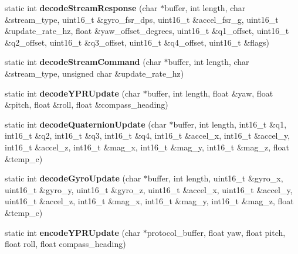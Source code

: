 \begin{DoxyCompactItemize}
\item 
\hypertarget{class_i_m_u_protocol_a97c641e18f3881b989a8f89fcb08458c}{}static int {\bfseries decode\+Stream\+Response} (char $\ast$buffer, int length, char \&stream\+\_\+type, uint16\+\_\+t \&gyro\+\_\+fsr\+\_\+dps, uint16\+\_\+t \&accel\+\_\+fsr\+\_\+g, uint16\+\_\+t \&update\+\_\+rate\+\_\+hz, float \&yaw\+\_\+offset\+\_\+degrees, uint16\+\_\+t \&q1\+\_\+offset, uint16\+\_\+t \&q2\+\_\+offset, uint16\+\_\+t \&q3\+\_\+offset, uint16\+\_\+t \&q4\+\_\+offset, uint16\+\_\+t \&flags)\label{class_i_m_u_protocol_a97c641e18f3881b989a8f89fcb08458c}

\item 
\hypertarget{class_i_m_u_protocol_af6c852e5e0fc5fe540d23920e0e2d3a0}{}static int {\bfseries decode\+Stream\+Command} (char $\ast$buffer, int length, char \&stream\+\_\+type, unsigned char \&update\+\_\+rate\+\_\+hz)\label{class_i_m_u_protocol_af6c852e5e0fc5fe540d23920e0e2d3a0}

\item 
\hypertarget{class_i_m_u_protocol_a2a833cb88f11b50e16001e8197ab1664}{}static int {\bfseries decode\+Y\+P\+R\+Update} (char $\ast$buffer, int length, float \&yaw, float \&pitch, float \&roll, float \&compass\+\_\+heading)\label{class_i_m_u_protocol_a2a833cb88f11b50e16001e8197ab1664}

\item 
\hypertarget{class_i_m_u_protocol_a2706f477f4b02197d09d55e436b24fd7}{}static int {\bfseries decode\+Quaternion\+Update} (char $\ast$buffer, int length, int16\+\_\+t \&q1, int16\+\_\+t \&q2, int16\+\_\+t \&q3, int16\+\_\+t \&q4, int16\+\_\+t \&accel\+\_\+x, int16\+\_\+t \&accel\+\_\+y, int16\+\_\+t \&accel\+\_\+z, int16\+\_\+t \&mag\+\_\+x, int16\+\_\+t \&mag\+\_\+y, int16\+\_\+t \&mag\+\_\+z, float \&temp\+\_\+c)\label{class_i_m_u_protocol_a2706f477f4b02197d09d55e436b24fd7}

\item 
\hypertarget{class_i_m_u_protocol_a39d4917878a4af8a173962c1991bbb95}{}static int {\bfseries decode\+Gyro\+Update} (char $\ast$buffer, int length, uint16\+\_\+t \&gyro\+\_\+x, uint16\+\_\+t \&gyro\+\_\+y, uint16\+\_\+t \&gyro\+\_\+z, uint16\+\_\+t \&accel\+\_\+x, uint16\+\_\+t \&accel\+\_\+y, uint16\+\_\+t \&accel\+\_\+z, int16\+\_\+t \&mag\+\_\+x, int16\+\_\+t \&mag\+\_\+y, int16\+\_\+t \&mag\+\_\+z, float \&temp\+\_\+c)\label{class_i_m_u_protocol_a39d4917878a4af8a173962c1991bbb95}

\item 
\hypertarget{class_i_m_u_protocol_a5043b90e784f5810b313489ae45fd19b}{}static int {\bfseries encode\+Y\+P\+R\+Update} (char $\ast$protocol\+\_\+buffer, float yaw, float pitch, float roll, float compass\+\_\+heading)\label{class_i_m_u_protocol_a5043b90e784f5810b313489ae45fd19b}


\end{DoxyCompactItemize}
